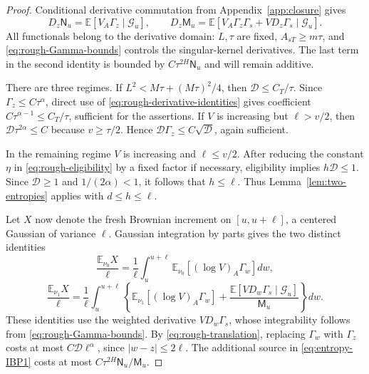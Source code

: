 \documentclass[11pt,a4paper]{amsart}
\theoremstyle{plain}
\theoremstyle{definition}
\theoremstyle{remark}
\newcommand{\EE}{\mathbb{E}}
\newcommand{\G}{\mathcal G}
\begin{document}
\begin{proof}
Conditional derivative commutation from Appendix~\ref{app:closure} gives
\begin{equation}\label{eq:rough-derivative-identities}
 D_z\mathsf N_u=\EE[V_A\Gamma_z\mid\G_u],\qquad
 D_z\mathsf M_u=\EE[V_A\Gamma_z\Gamma_s+V D_z\Gamma_s\mid\G_u].
\end{equation}
All functionals belong to the derivative domain: $L,\tau$ are fixed, $A_{sT}\ge m\tau$, and \eqref{eq:rough-Gamma-bounds} controls the singular-kernel derivatives. The last term in the second identity is bounded by $C\tau^{2H}\mathsf N_u$ and will remain additive.

There are three regimes. If $L^2<M\tau+(M\tau)^2/4$, then $\mathscr D\le C_T/\tau$. Since $\Gamma_z\le C\tau^\alpha$, direct use of \eqref{eq:rough-derivative-identities} gives coefficient $C\tau^{\alpha-1}\le C_T/\tau$, sufficient for the assertions. If $V$ is increasing but $\ell>v/2$, then $\mathscr D\tau^{2\alpha}\le C$ because $v\ge\tau/2$. Hence $\mathscr D\Gamma_z\le C\sqrt{\mathscr D}$, again sufficient.

In the remaining regime $V$ is increasing and $\ell\le v/2$. After reducing the constant $\eta$ in \eqref{eq:rough-eligibility} by a fixed factor if necessary, eligibility implies $h\mathscr D\le1$. Since $\mathscr D\ge1$ and $1/(2\alpha)<1$, it follows that $h\le\ell$. Thus Lemma~\ref{lem:two-entropies} applies with $d\le h\le\ell$.

Let $X$ now denote the fresh Brownian increment on $[u,u+\ell]$, a centered Gaussian of variance $\ell$. Gaussian integration by parts gives the two distinct identities
\begin{equation}\label{eq:entropy-IBP0}
 \frac{\EE_{\nu_0}X}{\ell}
 =\frac1\ell\int_u^{u+\ell}
             \EE_{\nu_0}[(\log V)_A\Gamma_w]dw,
\end{equation}
\begin{equation}\label{eq:entropy-IBP1}
 \frac{\EE_{\nu_1}X}{\ell}
 =\frac1\ell\int_u^{u+\ell}
 \left\{\EE_{\nu_1}[(\log V)_A\Gamma_w]
       +\frac{\EE[V D_w\Gamma_s\mid\G_u]}{\mathsf M_u}\right\}dw.
\end{equation}
These identities use the weighted derivative $V D_w\Gamma_s$, whose integrability follows from \eqref{eq:rough-Gamma-bounds}. By \eqref{eq:rough-translation}, replacing $\Gamma_w$ with $\Gamma_z$ costs at most $C\mathscr D\ell^\alpha$, since $|w-z|\le2\ell$. The additional source in \eqref{eq:entropy-IBP1} costs at most $C\tau^{2H}\mathsf N_u/\mathsf M_u$.


\end{proof}
\end{document}
